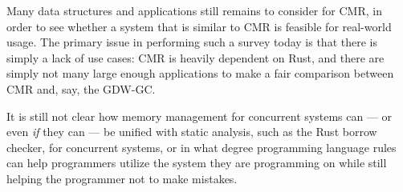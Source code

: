 Many data structures and applications still remains to consider for CMR\@, in order to see whether
a system that is similar to CMR is feasible for real-world usage. The primary issue in performing
such a survey today is that there is simply a lack of use cases: CMR is heavily dependent on Rust,
and there are simply not many large enough applications to make a fair comparison between CMR and,
say, the GDW-GC\@.

It is still not clear how memory management for concurrent systems can --- or even \emph{if} they
can --- be unified with static analysis, such as the Rust borrow checker, for concurrent systems,
or in what degree programming language rules can help programmers utilize the system they are
programming on while still helping the programmer not to make mistakes.
